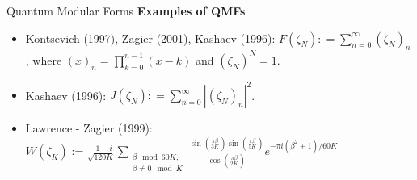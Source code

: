 \documentclass[final,10pt]{beamer}
\newlength{\colwidth}
\begin{document}
\begin{frame}[t]
\begin{columns}[t]
\begin{column}{\colwidth}
\begin{block}{Quantum Modular Forms}
\textbf{Examples of QMFs}\vspace*{-0.7em}
\begin{itemize}
    \item  Kontsevich (1997), Zagier (2001), Kashaev (1996):  $F(\zeta_N) : =\sum_{n=0}^{\infty} (\zeta_N)_{n}$, where $(x)_{n} = \prod_{k = 0}^{n-1}(x-k)$ and $(\zeta_N)^N = 1$.
    \item Kashaev (1996): $J(\zeta_N) : = \sum_{n=0}^{\infty} |(\zeta_N)_{n}|^2$.
    \item Lawrence - Zagier (1999): $W(\zeta_K) := \frac{-1-i}{\sqrt{120K}}\sum\limits_{\substack{\beta \mod 60K,\\ \beta \neq 0 \mod K}} \frac{\sin(\frac{\pi \beta}{3K})\sin(\frac{\pi \beta}{5K})}{\cos(\frac{\pi \beta}{2K})}e^{-\pi i (\beta^2+1)/60K} $
\end{itemize}
\end{block}



\end{column}
\end{columns}
\end{frame}
\end{document}
